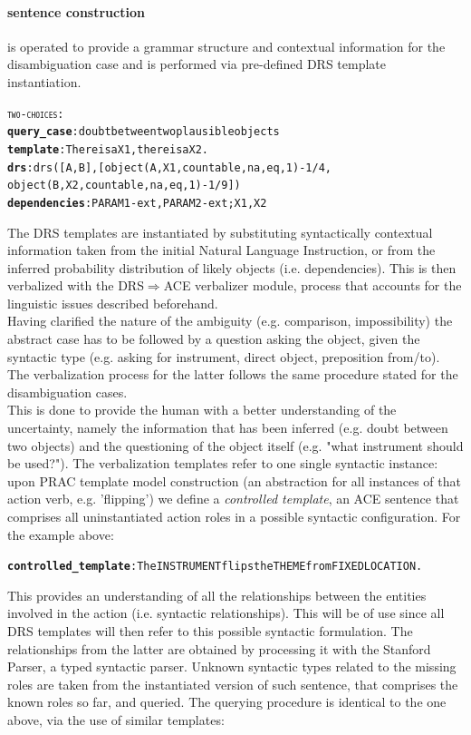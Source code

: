 \documentclass[oribibl]{llncs}
\begin{document}
\paragraph{sentence construction} is operated to provide a grammar structure and contextual information for the disambiguation case and is performed via pre-defined DRS template instantiation. 
\begin{alltt}

{\large \textsc{two-choices}}:
    \textbf{query_case}: doubt between two plausible objects
    \textbf{template}: There is a X1, there is a X2.
    \textbf{drs}: drs([A,B],[object(A,X1,countable,na,eq,1)-1/4,
    object(B,X2,countable,na,eq,1)-1/9])
    \textbf{dependencies}: PARAM1-ext, PARAM2-ext; X1, X2
\end{alltt}
The DRS templates are instantiated by substituting syntactically contextual information taken from the initial Natural Language Instruction, or from the inferred probability distribution of likely objects (i.e. dependencies).
This is then verbalized with the DRS$\Rightarrow$ACE verbalizer module, process that accounts for the linguistic issues described beforehand.\\
Having clarified the nature of the ambiguity (e.g. comparison, impossibility) the abstract case has to be followed by a question asking the object, given the syntactic type (e.g. asking for instrument, direct object, preposition from/to). The verbalization process for the latter follows the same procedure stated for the disambiguation cases. \\
This is done to provide the human with a better understanding of the uncertainty, namely the information that has been inferred (e.g. doubt between two objects) and the questioning of the object itself (e.g. "what instrument should be used?").  
The verbalization templates refer to one single syntactic instance: upon PRAC template model construction (an abstraction for all instances of that action verb, e.g. 'flipping') we define a \textit{controlled template}, an ACE sentence that comprises all uninstantiated action roles in a possible syntactic configuration.
For the example above:
{\small
\begin{alltt}
\textbf{controlled_template}: The INSTRUMENT flips the THEME from FIXEDLOCATION. 
\end{alltt}
}%
This provides an understanding of all the relationships between the entities involved in the action (i.e. syntactic relationships).
This will be of use since all DRS templates will then refer to this possible syntactic formulation. The relationships from the latter are obtained by processing it with the Stanford Parser\cite{mcdm08b}, a typed syntactic parser.
Unknown syntactic types related to the missing roles are taken from the instantiated version of such sentence, that comprises the known roles so far, and queried.
The querying procedure is identical to the one above, via the use of similar templates:
\end{document}
